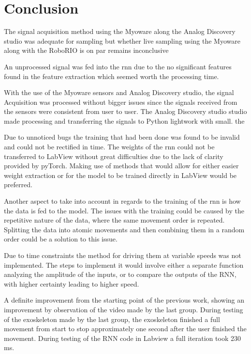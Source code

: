\section{Conclusion}

The signal acquisition method using the Myoware along the Analog Discovery studio was adequate for sampling but whether live sampling using the Myoware along with the RoboRIO is on par remains inconclusive 

An unprocessed signal was fed into the \acrshort{rnn} due to the no significant features found in the feature extraction which seemed worth the processing time.


With the use of the Myoware sensors and Analog Discovery studio, the signal Acquisition was processed without bigger issues since the signals received from the sensors were consistent from user to user. 
The Analog Discovery studio studio made processing and transferring the signals to Python lightwork with small. the 

Due to unnoticed bugs the training that had been done was found to be invalid and could not be rectified in time.
The weights of the \acrshort{rnn} could not be transferred to LabView without great difficulties due to the lack of clarity provided by
pyTorch. Making use of methods that would allow for either easier weight extraction or for the model to be trained
directly in LabView would be preferred.

Another aspect to take into account in regards to the training of the \acrshort{rnn} is how the data is fed to the model. The issues
with the training could be caused by the repetitive nature of the data, where the same movement order is repeated. Splitting the data
into atomic movements and then combining them in a random order could be a solution to this issue.

Due to time constraints the method for driving them at variable speeds was not implemented. The steps to implement it
would involve either a separate function analyzing the amplitude of the inputs, or to compare the outputs of the RNN,
with higher certainty leading to higher speed.

A definite improvement from the starting point of the previous work, showing an improvement by observation of the video made by the last group. During testing of the exoskeleton made by the last group,
the exoskeleton finished a full movement from start to stop approximately one second after the user finished the movement. During testing of the RNN code in Labview a full iteration took 230 ms.
